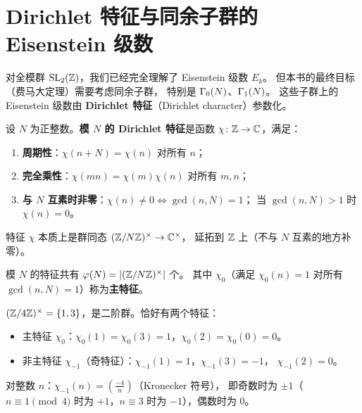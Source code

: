 \section{Dirichlet 特征与同余子群的 Eisenstein 级数}
\label{sec:eisenstein-congruence}

对全模群 $\mathrm{SL}_2(\mathbb{Z})$，我们已经完全理解了 Eisenstein 级数 $E_k$。
但本书的最终目标（费马大定理）需要考虑同余子群，
特别是 $\Gamma_0(N)$、$\Gamma_1(N)$。
这些子群上的 Eisenstein 级数由 \textbf{Dirichlet 特征}（Dirichlet character）参数化。

\begin{definition}[Dirichlet 特征]
\label{def:dirichlet-character}
设 $N$ 为正整数。\textbf{模 $N$ 的 Dirichlet 特征}是函数 $\chi\colon \mathbb{Z} \to \mathbb{C}$，满足：
\begin{enumerate}
  \item \textbf{周期性}：$\chi(n + N) = \chi(n)$ 对所有 $n$；
  \item \textbf{完全乘性}：$\chi(mn) = \chi(m)\chi(n)$ 对所有 $m, n$；
  \item \textbf{与 $N$ 互素时非零}：$\chi(n) \neq 0 \iff \gcd(n, N) = 1$；
    当 $\gcd(n, N) > 1$ 时 $\chi(n) = 0$。
\end{enumerate}
特征 $\chi$ 本质上是群同态 $(\mathbb{Z}/N\mathbb{Z})^\times \to \mathbb{C}^\times$，
延拓到 $\mathbb{Z}$ 上（不与 $N$ 互素的地方补零）。

模 $N$ 的特征共有 $\varphi(N) = |(\mathbb{Z}/N\mathbb{Z})^\times|$ 个。
其中 $\chi_0$（满足 $\chi_0(n) = 1$ 对所有 $\gcd(n,N)=1$）称为\textbf{主特征}。
\end{definition}



\begin{example}[模 $4$ 的特征]
\label{ex:chi-mod4}
$(\mathbb{Z}/4\mathbb{Z})^\times = \{1, 3\}$，是二阶群。恰好有两个特征：
\begin{itemize}
  \item 主特征 $\chi_0$：$\chi_0(1) = \chi_0(3) = 1$，$\chi_0(2) = \chi_0(0) = 0$。
  \item 非主特征 $\chi_{-1}$（奇特征）：$\chi_{-1}(1) = 1$，$\chi_{-1}(3) = -1$，
    $\chi_{-1}(2) = 0$。
\end{itemize}
对整数 $n$：$\chi_{-1}(n) = \left(\frac{-4}{n}\right)$（Kronecker 符号），
即奇数时为 $\pm 1$（$n \equiv 1 \pmod 4$ 时为 $+1$，$n \equiv 3$ 时为 $-1$），偶数时为 $0$。
\end{example}

